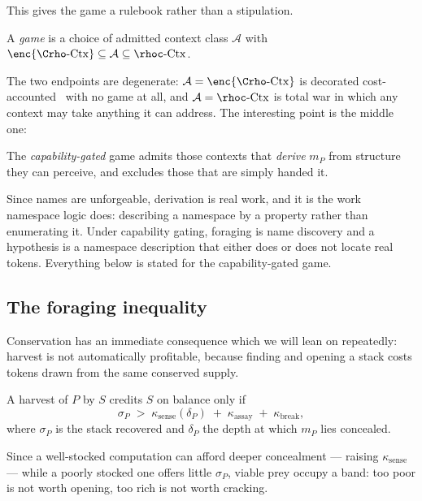 This gives the game a rulebook rather than a stipulation.

\begin{definition}
\label{sci:def:game}
A \emph{game} is a choice of admitted context class $\mathcal{A}$ with
$\enc{\Crho\text{-}\mathrm{Ctx}} \subseteq \mathcal{A} \subseteq \rhoc\text{-}\mathrm{Ctx}$.
\end{definition}

The two endpoints are degenerate: $\mathcal{A} = \enc{\Crho\text{-}\mathrm{Ctx}}$ is decorated
cost-accounted \rhoc\ with no game at all, and $\mathcal{A} = \rhoc\text{-}\mathrm{Ctx}$ is total war
in which any context may take anything it can address. The interesting point is the middle one:

\begin{definition}\label{sci:capability-gating}
The \emph{capability-gated} game admits those contexts that \emph{derive} $m_P$ from structure they
can perceive, and excludes those that are simply handed it.
\end{definition}

Since names are unforgeable, derivation is real work, and it is the work namespace logic does:
describing a namespace by a property rather than enumerating it. Under capability gating, foraging is
name discovery and a hypothesis is a namespace description that either does or does not locate real
tokens. Everything below is stated for the capability-gated game.

\subsection{The foraging inequality}\label{sci:S7.4}

Conservation has an immediate consequence which we will lean on repeatedly: harvest is not
automatically profitable, because finding and opening a stack costs tokens drawn from the same
conserved supply.

\begin{proposition}
\label{sci:prop:foraging}
A harvest of $P$ by $S$ credits $S$ on balance only if
\[
\sigma_P \;>\; \kappa_{\mathrm{sense}}(\delta_P) \;+\; \kappa_{\mathrm{assay}} \;+\;
\kappa_{\mathrm{break}},
\]
where $\sigma_P$ is the stack recovered and $\delta_P$ the depth at which $m_P$ lies concealed.
\end{proposition}

\begin{corollary}
\label{sci:cor:band}
Since a well-stocked computation can afford deeper concealment --- raising $\kappa_{\mathrm{sense}}$
--- while a poorly stocked one offers little $\sigma_P$, viable prey occupy a band: too poor is not
worth opening, too rich is not worth cracking.
\end{corollary}

